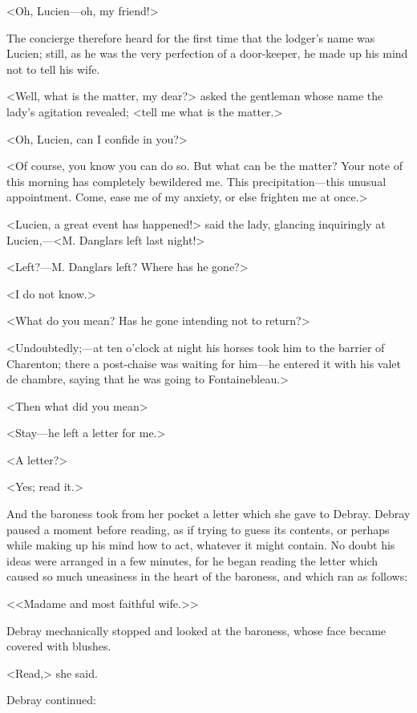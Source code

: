  <Oh, Lucien—oh, my friend!> 

 The concierge therefore heard for the first time that the lodger's name was Lucien; still, as he was the very perfection of a door-keeper, he made up his mind not to tell his wife. 

 <Well, what is the matter, my dear?> asked the gentleman whose name the lady's agitation revealed; <tell me what is the matter.> 

 <Oh, Lucien, can I confide in you?> 

 <Of course, you know you can do so. But what can be the matter? Your note of this morning has completely bewildered me. This precipitation—this unusual appointment. Come, ease me of my anxiety, or else frighten me at once.> 

 <Lucien, a great event has happened!> said the lady, glancing inquiringly at Lucien,—<M. Danglars left last night!> 

 <Left?—M. Danglars left? Where has he gone?> 

 <I do not know.> 

 <What do you mean? Has he gone intending not to return?> 

 <Undoubtedly;—at ten o'clock at night his horses took him to the barrier of Charenton; there a post-chaise was waiting for him—he entered it with his valet de chambre, saying that he was going to Fontainebleau.> 

 <Then what did you mean\longdash> 

 <Stay—he left a letter for me.> 

 <A letter?> 

 <Yes; read it.> 

 And the baroness took from her pocket a letter which she gave to Debray. Debray paused a moment before reading, as if trying to guess its contents, or perhaps while making up his mind how to act, whatever it might contain. No doubt his ideas were arranged in a few minutes, for he began reading the letter which caused so much uneasiness in the heart of the baroness, and which ran as follows: 

 <<Madame and most faithful wife.>> 

 Debray mechanically stopped and looked at the baroness, whose face became covered with blushes. 

 <Read,> she said. 

 Debray continued: 


